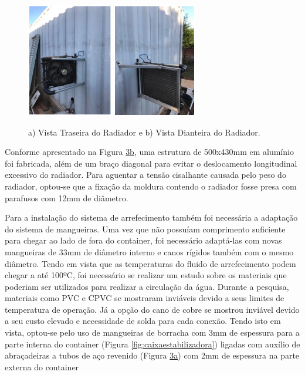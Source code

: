 \begin{figure}[h!]
\begin{center}
	\includegraphics[height=5cm]{figuras/vista-traseira-radiador.png} \quad
	\includegraphics[height=5cm]{figuras/vista-dianteira-radiador.png}
	\caption{a) Vista Traseira do Radiador e b) Vista Dianteira do Radiador.}
 	\label{fig:vistaradiador}
\end{center}
\end{figure}

Conforme apresentado na Figura \hyperref[fig:vistaradiador]{3b}, uma estrutura de 500x430mm em alumínio foi fabricada, além de um braço diagonal para evitar o deslocamento longitudinal excessivo do radiador. Para aguentar a tensão cisalhante causada pelo peso do radiador, optou-se que a fixação da moldura contendo o radiador fosse presa com parafusos com 12mm de diâmetro.

Para a instalação do sistema de arrefecimento também foi necessária a adaptação do sistema de mangueiras. Uma vez que não possuíam comprimento suficiente para chegar ao lado de fora do container, foi necessário adaptá-las com novas mangueiras de 33mm de diâmetro interno e canos rígidos também com o mesmo diâmetro. Tendo em vista que as temperaturas do fluido de arrefecimento podem chegar a até 100ºC, foi necessário se realizar um estudo sobre os materiais que poderiam ser utilizados para realizar a circulação da água. Durante a pesquisa, materiais como PVC e CPVC se mostraram inviáveis devido a seus limites de temperatura de operação. Já a opção do cano de cobre se mostrou inviável devido a seu custo elevado e necessidade de solda para cada conexão. Tendo isto em vista, optou-se pelo uso de mangueiras de borracha com 3mm de espessura para a parte interna do container (Figura \ref{fig:caixaestabilizadora}) ligadas com auxílio de abraçadeiras a tubos de aço revenido (Figura \hyperref[fig:vistaradiador]{3a}) com 2mm de espessura na parte externa do container


